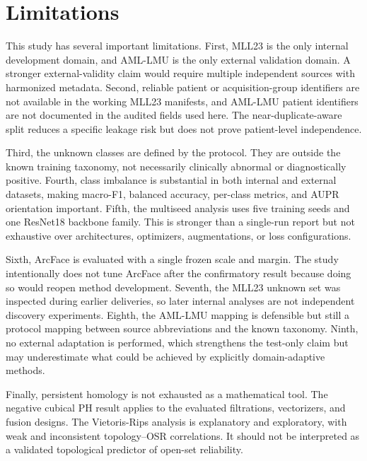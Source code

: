 \section{Limitations}

This study has several important limitations. First, MLL23 is the only internal development domain, and AML-LMU is the only external validation domain. A stronger external-validity claim would require multiple independent sources with harmonized metadata. Second, reliable patient or acquisition-group identifiers are not available in the working MLL23 manifests, and AML-LMU patient identifiers are not documented in the audited fields used here. The near-duplicate-aware split reduces a specific leakage risk but does not prove patient-level independence.

Third, the unknown classes are defined by the protocol. They are outside the known training taxonomy, not necessarily clinically abnormal or diagnostically positive. Fourth, class imbalance is substantial in both internal and external datasets, making macro-F1, balanced accuracy, per-class metrics, and AUPR orientation important. Fifth, the multiseed analysis uses five training seeds and one ResNet18 backbone family. This is stronger than a single-run report but not exhaustive over architectures, optimizers, augmentations, or loss configurations.

Sixth, ArcFace is evaluated with a single frozen scale and margin. The study intentionally does not tune ArcFace after the confirmatory result because doing so would reopen method development. Seventh, the MLL23 unknown set was inspected during earlier deliveries, so later internal analyses are not independent discovery experiments. Eighth, the AML-LMU mapping is defensible but still a protocol mapping between source abbreviations and the known taxonomy. Ninth, no external adaptation is performed, which strengthens the test-only claim but may underestimate what could be achieved by explicitly domain-adaptive methods.

Finally, persistent homology is not exhausted as a mathematical tool. The negative cubical PH result applies to the evaluated filtrations, vectorizers, and fusion designs. The Vietoris-Rips analysis is explanatory and exploratory, with weak and inconsistent topology--OSR correlations. It should not be interpreted as a validated topological predictor of open-set reliability.
